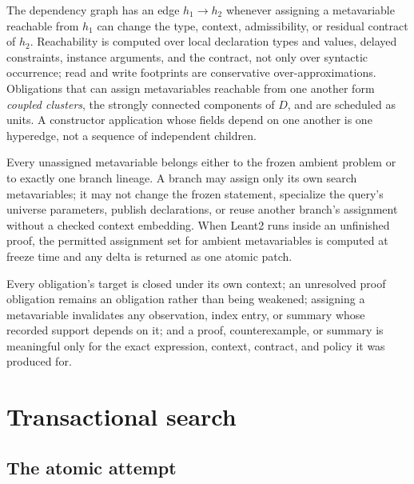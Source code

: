The dependency graph has an edge $h_1 \to h_2$ whenever assigning a metavariable reachable from $h_1$ can change the type, context, admissibility, or residual contract of $h_2$. Reachability is computed over local declaration types and values, delayed constraints, instance arguments, and the contract, not only over syntactic occurrence; read and write footprints are conservative over-approximations. Obligations that can assign metavariables reachable from one another form \emph{coupled clusters}, the strongly connected components of $D$, and are scheduled as units. A constructor application whose fields depend on one another is one hyperedge, not a sequence of independent children.

\begin{invariant}\label{inv:ownership}
Every unassigned metavariable belongs either to the frozen ambient problem or to exactly one branch lineage. A branch may assign only its own search metavariables; it may not change the frozen statement, specialize the query's universe parameters, publish declarations, or reuse another branch's assignment without a checked context embedding. When Leant2 runs inside an unfinished proof, the permitted assignment set for ambient metavariables is computed at freeze time and any delta is returned as one atomic patch.
\end{invariant}

\begin{invariant}\label{inv:four}
Every obligation's target is closed under its own context; an unresolved proof obligation remains an obligation rather than being weakened; assigning a metavariable invalidates any observation, index entry, or summary whose recorded support depends on it; and a proof, counterexample, or summary is meaningful only for the exact expression, context, contract, and policy it was produced for.
\end{invariant}

\section{Transactional search}\label{sec:transactions}

\subsection{The atomic attempt}

